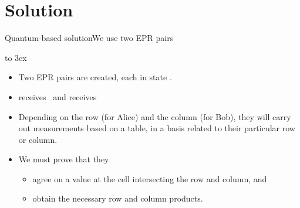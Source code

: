 
\section*{Solution}

\begin{frame}{Quantum-based solution}{We use two EPR pairs}

\Vskip{-4em}\begin{center}
%
\hbox to 3ex{\hss}%
\end{center}%

\begin{itemize}[<+->]
    \item Two EPR pairs are created, each in state .
    \item {} receives~ and  receives~
    \item Depending on the row (for Alice) and the column (for Bob), they will carry out measurements based on a table, in a basis related to their particular row or column.
    \item We must prove that they
    \begin{itemize}
        \item agree on a value at the cell intersecting the row and column, and
        \item obtain the necessary row and column products.
    \end{itemize}
\end{itemize}
    
\end{frame}

